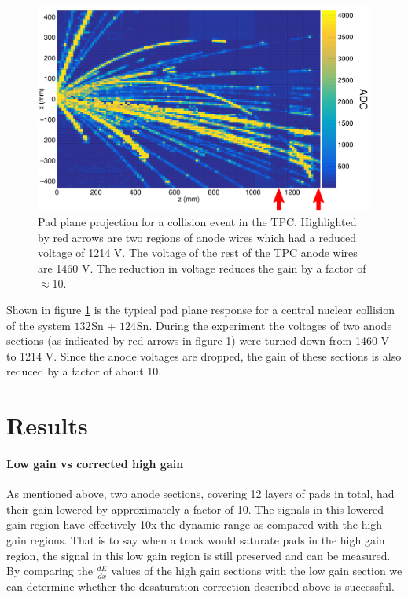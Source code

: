 \documentclass[review]{elsarticle}
\begin{document}
\begin{figure}[ht]
\includegraphics[width=\linewidth]{data}
\caption{Pad plane projection for a collision event in the TPC. Highlighted by red arrows are two regions of anode wires which had a reduced voltage of 1214 V. The voltage of the rest of the TPC anode wires are 1460 V. The reduction in voltage reduces the gain by a factor of $\approx$10. }
\label{fig:data}
\end{figure}

Shown in figure \ref{fig:data} is the typical pad plane response for a central nuclear collision of the system ${132}^{}$Sn + ${124}^{}$Sn. During the experiment the voltages of two anode sections (as indicated by red arrows in figure \ref{fig:data}) were turned down from 1460 V to 1214 V. Since the anode voltages are dropped, the gain of these sections is also reduced by a factor of about 10. 


\section{Results}
\paragraph{Low gain vs corrected high gain}

As mentioned above, two anode sections, covering 12 layers of pads in total, had their gain lowered by approximately a factor of 10. The signals in this lowered gain region have effectively 10x the dynamic range as compared with the high gain regions. That is to say when a track would saturate pads in the high gain region, the signal in this low gain region is still preserved and can be measured. By comparing the $\frac{dE}{dx}$ values of the high gain sections with the low gain section we can determine whether the desaturation correction described above is successful. 
\end{document}
